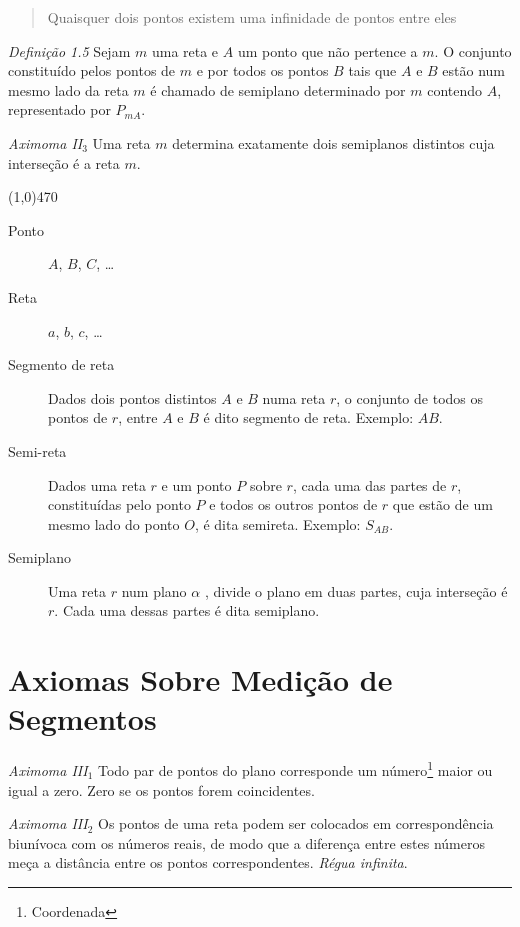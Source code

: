 \documentclass[11pt]{article}
\begin{document}
\begin{quote}
  Quaisquer dois pontos existem uma infinidade de pontos entre eles
\end{quote}

\emph{Definição 1.5} Sejam $m$ uma reta e $A$ um ponto que não pertence a
$m$. O conjunto constituído pelos pontos de $m$ e por todos os pontos $B$ tais
que $A$ e $B$ estão num mesmo lado da reta $m$ é chamado de semiplano
determinado por $m$ contendo $A$, representado por $P_{mA}$.

\emph{Aximoma II$_{3}$} Uma reta $m$ determina exatamente dois semiplanos distintos
cuja interseção é a reta $m$.

\line(1,0){470}

\begin{description}
  \item[Ponto] $A$, $B$, $C$, \ldots

  \item[Reta] $a$, $b$, $c$, \ldots

  \item[Segmento de reta]
  Dados dois pontos distintos $A$ e $B$ numa reta $r$, o conjunto de todos os
  pontos de $r$, entre $A$ e $B$ é dito segmento de reta. Exemplo: $AB$.

  \item[Semi-reta]
  Dados uma reta $r$ e um ponto $P$ sobre $r$, cada uma das partes de $r$,
  constituídas pelo ponto $P$ e todos os outros pontos de $r$ que estão de um
  mesmo lado do ponto $O$, é dita semireta. Exemplo: $S_{AB}$.

  \item[Semiplano]
  Uma reta $r$ num plano $\alpha$ , divide o plano em duas partes, cuja
  interseção é $r$. Cada uma dessas partes é dita semiplano.
\end{description}

\section{Axiomas Sobre Medição de Segmentos}

\emph{Aximoma III$_{1}$} Todo par de pontos do plano corresponde um
número\footnote{Coordenada} maior ou igual a zero. Zero se os pontos forem
coincidentes.

\emph{Aximoma III$_{2}$} Os pontos de uma reta podem ser colocados em
correspondência biunívoca com os números reais, de modo que a diferença entre
estes números meça a distância entre os pontos correspondentes. \emph{Régua
infinita}.
\end{document}
